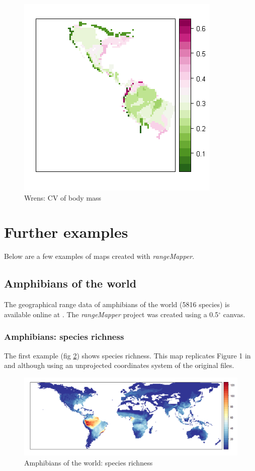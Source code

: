 \documentclass[ a4paper ]{article}
\begin{document}
	
		\begin{figure}[htbp]
  \begin{center}
	\includegraphics[width=0.5\linewidth]{map2b}
    \caption{\label{fig:map2b} Wrens: CV of body mass}
  \end{center}
\end{figure}	
	
	
	
 \pagebreak	
\section{Further examples}
Below are a few examples of maps created with \emph{rangeMapper}.

\subsection{Amphibians of the world}
The geographical range data of amphibians of the world (5816 species) is available online at \cite{iucn09}. The \emph{rangeMapper} project was created using a 0.5$^{\circ}$ canvas.

\subsubsection{Amphibians: species richness}
The first example (fig \ref{fig:map1}) shows species richness. This map replicates Figure 1 in \cite{buckley07} and \cite{amphibiaweb09} although using an unprojected coordinates system of the original files.

\begin{figure}[htbp]
  \begin{center}
	\includegraphics[width=1\linewidth]{map1}
    \caption{\label{fig:map1} Amphibians of the world: species richness}
  \end{center}
\end{figure}
\end{document}
